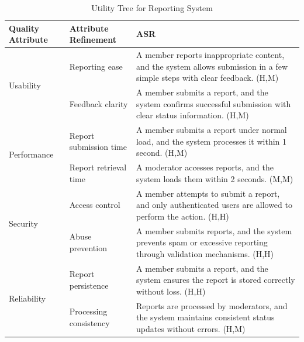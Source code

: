 \documentclass{article}
\begin{document}
\begin{table}[H]
    \centering
    \caption{Utility Tree for Reporting System}
    \begin{tabular}{|p{3cm}|p{4cm}|p{7cm}|}
        \hline
        \textbf{Quality Attribute} & \textbf{Attribute Refinement}                                                                                             & \textbf{ASR} \\
        \hline

        \multirow{2}{*}{Usability}
                                   & Reporting ease
                                   & A member reports inappropriate content, and the system allows submission in a few simple steps with clear feedback. (H,M)                \\
        \cline{2-3}
                                   & Feedback clarity
                                   & A member submits a report, and the system confirms successful submission with clear status information. (H,M)                            \\
        \hline

        \multirow{2}{*}{Performance}
                                   & Report submission time
                                   & A member submits a report under normal load, and the system processes it within 1 second. (H,M)                                          \\
        \cline{2-3}
                                   & Report retrieval time
                                   & A moderator accesses reports, and the system loads them within 2 seconds. (M,M)                                                          \\
        \hline

        \multirow{2}{*}{Security}
                                   & Access control
                                   & A member attempts to submit a report, and only authenticated users are allowed to perform the action. (H,H)                              \\
        \cline{2-3}
                                   & Abuse prevention
                                   & A member submits reports, and the system prevents spam or excessive reporting through validation mechanisms. (H,H)                       \\
        \hline

        \multirow{2}{*}{Reliability}
                                   & Report persistence
                                   & A member submits a report, and the system ensures the report is stored correctly without loss. (H,H)                                     \\
        \cline{2-3}
                                   & Processing consistency
                                   & Reports are processed by moderators, and the system maintains consistent status updates without errors. (H,M)                            \\
        \hline


\end{tabular}
\end{table}
\end{document}
